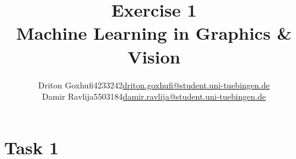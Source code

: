\documentclass [a4paper, 11pt] {article}
\makeatletter
\newcommand{\courseName}{Machine Learning in Graphics \& Vision}
\newcommand{\homeworkNum}{1}
\newcommand{\studentOne}{Driton Goxhufi}
\newcommand{\studentTwo} {Damir Ravlija}
\newcommand{\matrikelNrStOne}{4233242}
\newcommand{\matrikelNrStTwo}{5503184}
\newcommand{\mailStOne}{driton.goxhufi@student.uni-tuebingen.de}
\newcommand{\mailStTwo}{damir.ravlija@student.uni-tuebingen.de}
\makeatother
\begin{document}
	
\title{\vspace{-1.5cm}\textbf{Exercise \homeworkNum} \\ 
	\courseName}
\author{\begin{tabular}{lcr}
		\studentOne & \matrikelNrStOne & \href{mailto:\mailStOne}{\mailStOne} \\
		\studentTwo & \matrikelNrStTwo & \href{mailto:\mailStTwo}{\mailStTwo} 
\end{tabular}}	
\date{}
\maketitle


\section{Task 1}
\end{document}
